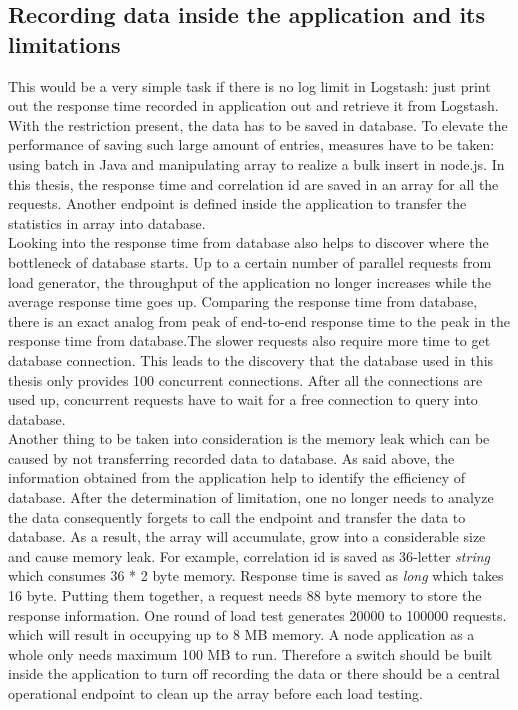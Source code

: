   \subsection{Recording data inside the application and its limitations}
This would be a very simple task if there is no log limit in Logstash: just print out the response time recorded in application out and retrieve it from Logstash. With the restriction present, the data has to be saved in database. To elevate the performance of saving such large amount of entries, measures have to be taken: using batch in Java and manipulating array to realize a bulk insert in node.js. In this thesis, the response time and correlation id are saved in an array for all the requests. Another endpoint is defined inside the application to transfer the statistics in array into database.\\
Looking into the response time from database also helps to discover where the bottleneck of database starts. Up to a certain number of parallel requests from load generator, the throughput of the application no longer increases while the average response time goes up. Comparing the response time from database, there is an exact analog from peak of end-to-end response time to the peak in the response time from database.The slower requests also require more time to get database connection. This leads to the discovery that the database used in this thesis only provides 100  concurrent connections. After all the connections are used up, concurrent requests have to wait for a free connection to query into database. \\
Another thing to be taken into consideration is the memory leak which can be caused by not transferring recorded data to database. As said above, the information obtained from the application help to identify the efficiency of database. After the determination of limitation, one no longer needs to analyze the data consequently forgets to call the endpoint and transfer the data to database. As a result, the array will accumulate, grow into a considerable size and cause memory leak. For example, correlation id is saved as 36-letter \textit{string} which consumes 36 * 2 byte memory. Response time is saved as \textit{long} which takes 16 byte. Putting them together, a request needs 88 byte memory to store the response information. One round of load test generates 20000 to 100000 requests. which will result in occupying up to 8 MB memory. A node application as a whole only needs maximum 100 MB to run. Therefore a switch should be built inside the application to turn off recording the data or there should be a central operational endpoint to clean up the array before each load testing. 
